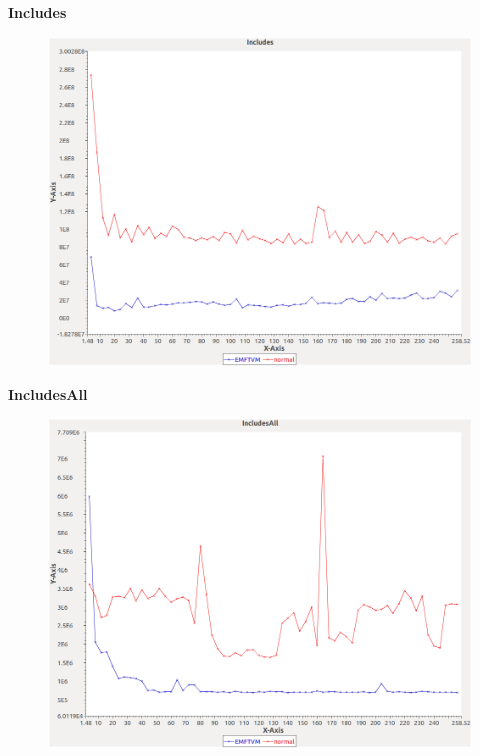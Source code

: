 \noindent\textbf{Includes}

\begin{figure}[h]
\centering
\includegraphics[width=\textwidth]{../graphs/sequence/Includes}
\end{figure}
\pagebreak

\noindent\textbf{IncludesAll}

\begin{figure}[h]
\centering
\includegraphics[width=\textwidth]{../graphs/sequence/IncludesAll}
\end{figure}
\pagebreak

